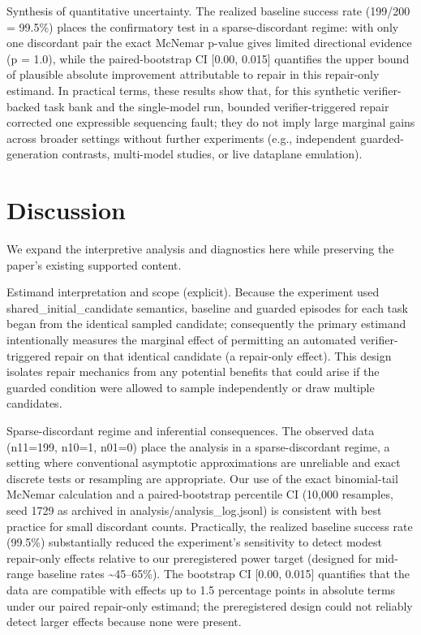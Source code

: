 \documentclass[conference]{IEEEtran}
\begin{document}
Synthesis of quantitative uncertainty. The realized baseline success rate (199/200 = 99.5\%) places the confirmatory test in a sparse-discordant regime: with only one discordant pair the exact McNemar p-value gives limited directional evidence (p = 1.0), while the paired-bootstrap CI [0.00, 0.015] quantifies the upper bound of plausible absolute improvement attributable to repair in this repair-only estimand. In practical terms, these results show that, for this synthetic verifier-backed task bank and the single-model run, bounded verifier-triggered repair corrected one expressible sequencing fault; they do not imply large marginal gains across broader settings without further experiments (e.g., independent guarded-generation contrasts, multi-model studies, or live dataplane emulation).

\section{Discussion}
We expand the interpretive analysis and diagnostics here while preserving the paper's existing supported content.

Estimand interpretation and scope (explicit). Because the experiment used shared\_initial\_candidate semantics, baseline and guarded episodes for each task began from the identical sampled candidate; consequently the primary estimand intentionally measures the marginal effect of permitting an automated verifier-triggered repair on that identical candidate (a repair-only effect). This design isolates repair mechanics from any potential benefits that could arise if the guarded condition were allowed to sample independently or draw multiple candidates.

Sparse-discordant regime and inferential consequences. The observed data (n11=199, n10=1, n01=0) place the analysis in a sparse-discordant regime, a setting where conventional asymptotic approximations are unreliable and exact discrete tests or resampling are appropriate. Our use of the exact binomial-tail McNemar calculation and a paired-bootstrap percentile CI (10,000 resamples, seed 1729 as archived in analysis/analysis\_log.jsonl) is consistent with best practice for small discordant counts. Practically, the realized baseline success rate (99.5\%) substantially reduced the experiment's sensitivity to detect modest repair-only effects relative to our preregistered power target (designed for mid-range baseline rates \textasciitilde{}45--65\%). The bootstrap CI [0.00, 0.015] quantifies that the data are compatible with effects up to 1.5 percentage points in absolute terms under our paired repair-only estimand; the preregistered design could not reliably detect larger effects because none were present.
\end{document}
